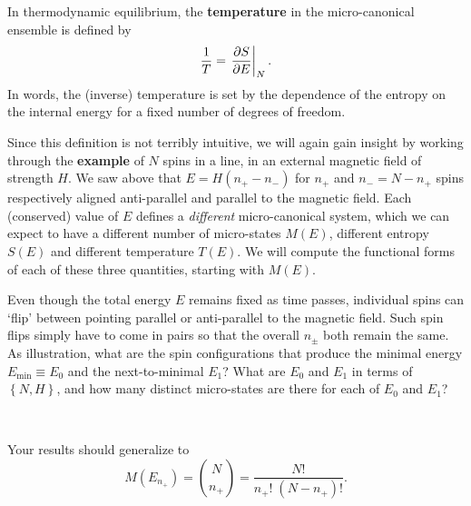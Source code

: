 \begin{shaded}
  In thermodynamic equilibrium, the \textbf{temperature} in the micro-canonical ensemble is defined by
  \begin{equation}
    \label{eq:temperature}
    \frac{1}{T} = \left. \frac{\partial S}{\partial E}\right|_N.
  \end{equation}
  In words, the (inverse) temperature is set by the dependence of the entropy on the internal energy for a fixed number of degrees of freedom.
\end{shaded}

Since this definition is not terribly intuitive, we will again gain insight by working through the \textbf{example} of $N$ spins in a line, in an external magnetic field of strength $H$.
We saw above that $E = H(n_+ - n_-)$ for $n_+$ and $n_- = N - n_+$ spins respectively aligned anti-parallel and parallel to the magnetic field.
Each (conserved) value of $E$ defines a \textit{different} micro-canonical system, which we can expect to have a different number of micro-states $M(E)$, different entropy $S(E)$ and different temperature $T(E)$.
We will compute the functional forms of each of these three quantities, starting with $M(E)$.

Even though the total energy $E$ remains fixed as time passes, individual spins can `flip' between pointing parallel or anti-parallel to the magnetic field.
Such spin flips simply have to come in pairs so that the overall $n_{\pm}$ both remain the same.
As illustration, what are the spin configurations that produce the minimal energy $E_{\text{min}} \equiv E_0$ and the next-to-minimal $E_1$?
What are $E_0$ and $E_1$ in terms of $\left\{N, H\right\}$, and how many distinct micro-states are there for each of $E_0$ and $E_1$?
\begin{mdframed}
  \ \\[100 pt]
\end{mdframed}
Your results should generalize to
\begin{equation}
  \label{eq:spin_states}
  M(E_{n_+}) = \binom{N}{n_+} = \frac{N!}{n_+! \; (N - n_+)!}.
\end{equation}

